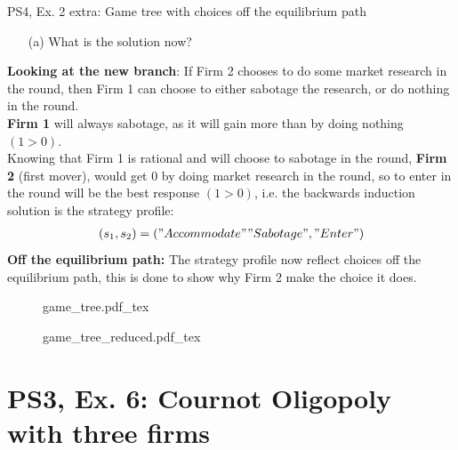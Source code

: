 \begin{frame}{PS4, Ex. 2 extra: Game tree with choices off the equilibrium path}
  \begin{multicols}{2}
    \begin{itemize}
      \item[(a)] What is the solution now?
    \end{itemize}
    \textbf{Looking at the new branch}: If Firm 2 chooses to do some market research in the  round, then Firm 1 can choose to either sabotage the research, or do nothing in the  round.\\\medskip
    \textbf{Firm 1} will always sabotage, as it will gain more than by doing nothing $(1>0)$.\\\medskip
    Knowing that Firm 1 is rational and will choose to sabotage in the  round, \textbf{Firm 2} (first mover), would get 0 by doing market research in the  round, so to enter in the  round will be the best response $(1>0)$, i.e. the backwards induction solution is the strategy profile:
      \begin{align*}
        (s_1,s_2)=("Accommodate""Sabotage","Enter")
      \end{align*}
    \textbf{Off the equilibrium path:} The strategy profile now reflect choices off the equilibrium path, this is done to show why Firm 2 make the choice it does.
  \vfill\null \columnbreak
    \begin{figure}[!h]
      \begin{center}
      \def\svgwidth{1.0\columnwidth}
      {game_tree.pdf_tex}
      \end{center}
    \end{figure}
    \begin{figure}[!h]
      \begin{center}
      \def\svgwidth{1.0\columnwidth}
      {game_tree_reduced.pdf_tex}
      \end{center}
    \end{figure}
  \vfill\null
  \end{multicols}
\end{frame}

\section{PS3, Ex. 6: Cournot Oligopoly with three firms}

